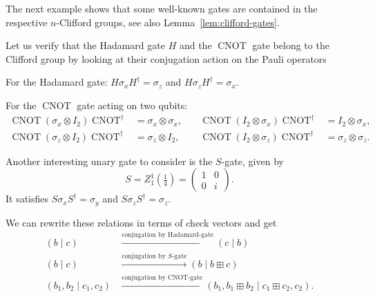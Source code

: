 \documentclass[a4paper, oneside, 12pt]{amsart}
\DeclareMathOperator{\CNOT}{CNOT}
\begin{document}
The next example shows that some well-known gates are contained in the respective \(n\)-Clifford groups, see also Lemma~\ref{lem:clifford-gates}.
\begin{example}\label{ex:CNOT-S-Hadamard-are-in-Clifford}
  Let us verify that the Hadamard gate \(H\) and the \(\CNOT\) gate belong to the Clifford group by looking at their conjugation action on the Pauli operators
  \begin{thmlist}
    \item For the Hadamard gate: \(H \sigma_x H^\dagger = \sigma_z\) and \(H \sigma_z H^\dagger = \sigma_x\).
    \item For the \(\CNOT\) gate acting on two qubits:
    \begin{align*}
      \CNOT (\sigma_x \otimes I_{2}) \CNOT^\dagger &= \sigma_x \otimes \sigma_x, \quad &\CNOT (I_{2} \otimes \sigma_x) \CNOT^\dagger &= I_{2} \otimes \sigma_x, \\
      \CNOT (\sigma_z \otimes I_{2}) \CNOT^\dagger &= \sigma_z \otimes I_{2}, \quad &\CNOT (I_{2} \otimes \sigma_z) \CNOT^\dagger &= \sigma_z \otimes \sigma_z.
    \end{align*}
  \end{thmlist}

  Another interesting unary gate to consider is the \(S\)-gate, given by
  \begin{equation*}
    S= Z_{1}^{1}(\tfrac{1}{4}) =
    \begin{pmatrix}
      1 & 0 \\
      0 & i
    \end{pmatrix}.
  \end{equation*}
  It satisfies \(S \sigma_x S^\dagger = \sigma_y\) and \(S \sigma_z S^\dagger = \sigma_z\).

  We can rewrite these relations in terms of check vectors and get
  \begin{subequations}
    \begin{align}
      (b \mid c) &\xrightarrow{\text{conjugation by Hadamard-gate}} (c \mid b) \\
      (b \mid c) &\xrightarrow{\text{conjugation by \(S\)-gate}} (b \mid b \boxplus c) \\
      (b_{1}, b_{2} \mid c_{1}, c_{2}) &\xrightarrow{\text{conjugation by \(\CNOT\)-gate}} (b_{1}, b_{1}\boxplus b_{2} \mid c_{1}\boxplus c_{2}, c_{2}).
    \end{align}
  \end{subequations}
\end{example}
\end{document}

